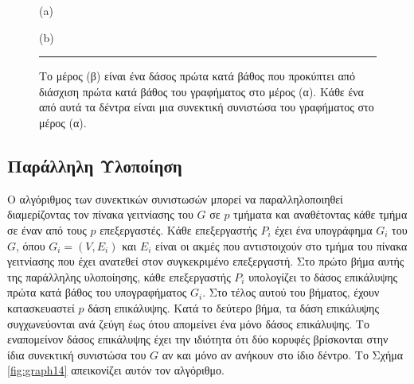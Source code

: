 \documentclass[12pt,a4paper]{article} %
\begin{document}
{{\begin{figure}[H]

\vspace{0.2cm}
(a)
\vspace{0.6cm}


\vspace{0.3cm}
(b)
\
\noindent\rule{\textwidth}{0.2pt}
\caption{Το μέρος (β) είναι ένα δάσος πρώτα κατά βάθος που προκύπτει από
διάσχιση πρώτα κατά βάθος του γραφήματος στο μέρος (α). Κάθε ένα από αυτά τα
δέντρα είναι μια συνεκτική συνιστώσα του γραφήματος στο μέρος (α).}
\label{fig:graph13}
\end{figure}
\vspace{0.3cm}
\subsection*{Παράλληλη Υλοποίηση}

Ο αλγόριθμος των συνεκτικών συνιστωσών μπορεί να παραλληλοποιηθεί
διαμερίζοντας τον πίνακα γειτνίασης του $G$ σε $p$ τμήματα και αναθέτοντας
κάθε τμήμα σε έναν από τους $p$ επεξεργαστές. Κάθε επεξεργαστής $P_i$ έχει
ένα υπογράφημα $G_i$ του $G$, όπου $G_i = (V, E_i)$ και $E_i$ είναι οι ακμές
που αντιστοιχούν στο τμήμα του πίνακα γειτνίασης που έχει ανατεθεί στον
συγκεκριμένο επεξεργαστή. Στο πρώτο βήμα αυτής της παράλληλης υλοποίησης,
κάθε επεξεργαστής $P_i$ υπολογίζει το δάσος επικάλυψης πρώτα κατά βάθος του
υπογραφήματος $G_i$. Στο τέλος αυτού του βήματος, έχουν κατασκευαστεί $p$
δάση επικάλυψης. Κατά το δεύτερο βήμα, τα δάση επικάλυψης
συγχωνεύονται ανά ζεύγη έως ότου απομείνει ένα μόνο δάσος επικάλυψης.
Το εναπομείνον δάσος επικάλυψης έχει την ιδιότητα ότι δύο κορυφές
βρίσκονται στην ίδια συνεκτική συνιστώσα του $G$ αν και μόνο αν ανήκουν
στο ίδιο δέντρο. Το Σχήμα \ref{fig:graph14} απεικονίζει αυτόν τον αλγόριθμο.

}}
\end{document}
